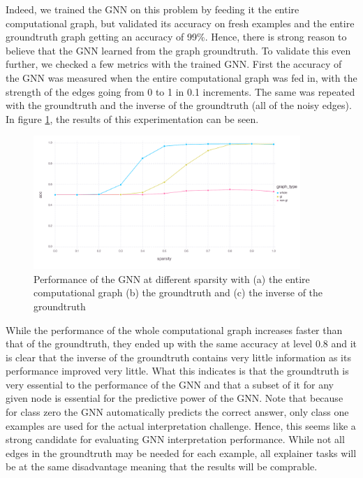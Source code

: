Indeed, we trained the GNN on this problem by feeding it the entire computational graph, but validated its accuracy on fresh examples and the entire groundtruth graph getting an accuracy of 99\%. Hence, there is strong reason to believe that the GNN learned from the graph groundtruth. To validate this even further, we checked a few metrics with the trained GNN. First the accuracy of the GNN was measured when the entire computational graph was fed in, with the strength of the edges going from 0 to 1 in 0.1 increments. The same was repeated with the groundtruth and the inverse of the groundtruth (all of the noisy edges). In figure \ref{fig:tree-model-sparsity}, the results of this experimentation can be seen. 
\begin{figure}[h]
	\centering
	\includegraphics[width=0.9\textwidth]{images/tree-model-sparsity.pdf}
	\caption{Performance of the GNN at different sparsity with (a) the entire computational graph (b) the groundtruth and (c) the inverse of the groundtruth}
	\label{fig:tree-model-sparsity}
\end{figure}

While the performance of the whole computational graph increases faster than that of the groundtruth, they ended up with the same accuracy at level 0.8 and it is clear that the inverse of the groundtruth contains very little information as its performance improved very little. What this indicates is that the groundtruth is very essential to the performance of the GNN and that a subset of it for any given node is essential for the predictive power of the GNN. Note that because for class zero the GNN automatically predicts the correct answer, only class one examples are used for the actual interpretation challenge. Hence, this seems like a strong candidate for evaluating GNN interpretation performance. While not all edges in the groundtruth may be needed for each example, all explainer tasks will be at the same disadvantage meaning that the results will be comprable.

\newpage
